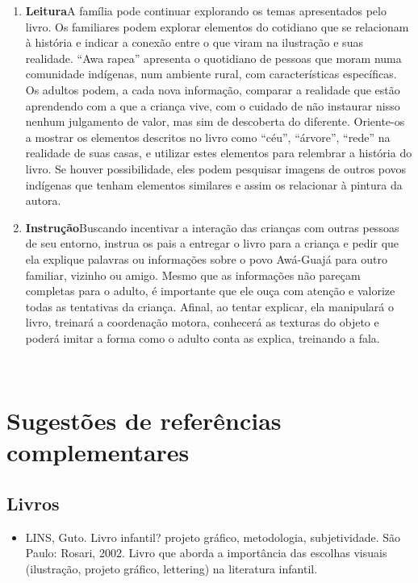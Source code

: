 \documentclass[11pt]{extarticle}
\begin{document}
{{\begin{enumerate}
\item \textbf{Leitura}\quad A família pode continuar 
explorando os temas apresentados pelo livro. Os familiares podem explorar 
elementos do cotidiano que se relacionam à história e indicar a conexão 
entre o que viram na ilustração e suas realidade. ``Awa rapea'' apresenta 
o quotidiano de pessoas que moram numa comunidade indígenas, num ambiente rural,
com características específicas. Os adultos podem, a cada nova informação, comparar
a realidade que estão aprendendo com a que a criança vive, com o cuidado
de não instaurar nisso nenhum julgamento de valor, mas sim de descoberta
do diferente. Oriente-os a mostrar os elementos descritos no livro como ``céu'',
``árvore'', ``rede'' na realidade de suas casas, e utilizar estes elementos para 
relembrar a história do livro. Se houver possibilidade, eles podem pesquisar 
imagens de outros povos indígenas que tenham elementos similares e assim os relacionar à pintura da autora. 

\item \textbf{Instrução}\quad Buscando incentivar a interação das crianças
com outras pessoas de seu entorno, instrua os pais a entregar o livro para a criança 
e pedir que ela explique palavras ou informações sobre o povo Awá-Guajá para outro familiar, vizinho ou amigo. 
Mesmo que as informações não pareçam 
completas para o adulto, é importante que ele ouça com atenção e 
valorize todas as tentativas da criança. Afinal, ao tentar explicar, 
ela manipulará o livro, treinará a coordenação motora, conhecerá as texturas 
do objeto e poderá imitar a forma como o adulto 
conta as explica, treinando a fala. 
\end{enumerate}

 
\section{Sugestões de referências complementares}

\subsection{Livros} 

\begin{itemize}
\item LINS, Guto. Livro infantil? projeto gráfico, metodologia, subjetividade. São Paulo: Rosari, 2002.
Livro que aborda a importância das escolhas visuais (ilustração, projeto gráfico, lettering) na literatura infantil.  


\end{itemize}}}
\end{document}
